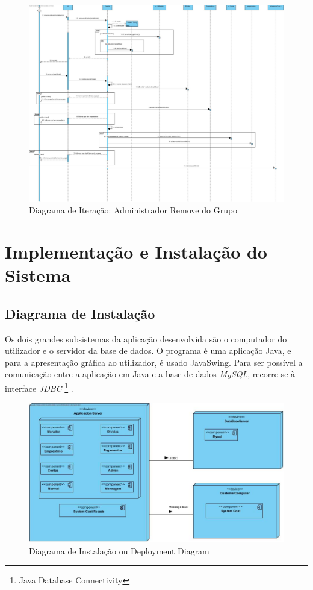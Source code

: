 \begin{figure}[htb!]
	\centering
	\includegraphics[scale=0.27]{imagens/DiagramaIt/AdminRemoveDoGrupo}  
	\caption{Diagrama de Iteração: Administrador Remove do Grupo}  
\end{figure}


\chapter{Implementação e Instalação do Sistema}

\section{Diagrama de Instalação}

Os dois grandes subsistemas da aplicação desenvolvida são o computador do utilizador e o servidor da base de dados. O programa é uma aplicação Java, e para a apresentação gráfica ao utilizador, é usado JavaSwing. Para ser possível a comunicação entre a aplicação em Java e a base de dados \textit{MySQL}, recorre-se à interface \textit{JDBC} \footnote{Java Database Connectivity} . 

\begin{figure}[htb!]
	\centering
	\includegraphics[scale=0.4]{imagens/DiagramInstalacao/DeploymentDiagram}  
	\caption{Diagrama de Instalação ou Deployment Diagram}  
\end{figure}

